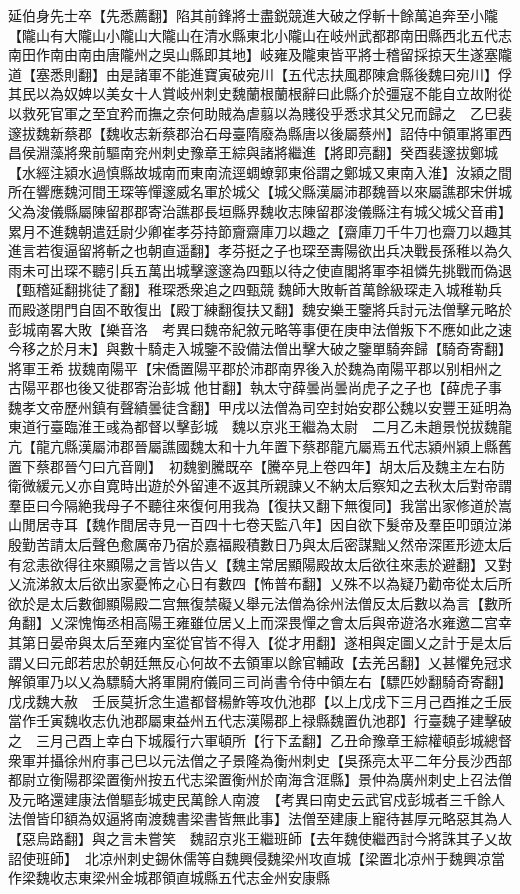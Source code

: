 延伯身先士卒【先悉薦翻】陷其前鋒將士盡鋭競進大破之俘斬十餘萬追奔至小隴【隴山有大隴山小隴山大隴山在清水縣東北小隴山在岐州武都郡南田縣西北五代志南田作南由南由唐隴州之吳山縣即其地】岐雍及隴東皆平將士稽留採掠天生遂塞隴道【塞悉則翻】由是諸軍不能進寶寅破宛川【五代志扶風郡陳倉縣後魏曰宛川】俘其民以為奴婢以美女十人賞岐州刺史魏蘭根蘭根辭曰此縣介於彊寇不能自立故附從以救死官軍之至宜矜而撫之奈何助賊為虐翦以為賤役乎悉求其父兄而歸之　乙巳裴邃拔魏新蔡郡【魏收志新蔡郡治石母臺隋廢為縣唐以後屬蔡州】詔侍中領軍將軍西昌侯淵藻將衆前驅南兖州刺史豫章王綜與諸將繼進【將即亮翻】癸酉裴邃拔鄭城【水經注潁水過慎縣故城南而東南流逕蜩蟟郭東俗謂之鄭城又東南入淮】汝潁之間所在響應魏河間王琛等憚邃威名軍於城父【城父縣漢屬沛郡魏晉以來屬譙郡宋併城父為浚儀縣屬陳留郡郡寄治譙郡長垣縣界魏收志陳留郡浚儀縣注有城父城父音甫】累月不進魏朝遣廷尉少卿崔孝芬持節齎齋庫刀以趣之【齋庫刀千牛刀也齋刀以趣其進言若復逼留將斬之也朝直遥翻】孝芬挺之子也琛至夀陽欲出兵决戰長孫稚以為久雨未可出琛不聽引兵五萬出城擊邃邃為四甄以待之使直閣將軍李祖憐先挑戰而偽退【甄稽延翻挑徒了翻】稚琛悉衆追之四甄競魏師大敗斬首萬餘級琛走入城稚勒兵而殿遂閉門自固不敢復出【殿丁練翻復扶又翻】魏安樂王鑒將兵討元法僧擊元略於彭城南畧大敗【樂音洛　考異曰魏帝紀敘元略等事便在庚申法僧叛下不應如此之速今移之於月末】與數十騎走入城鑒不設備法僧出擊大破之鑒單騎奔歸【騎奇寄翻】將軍王希拔魏南陽平【宋僑置陽平郡於沛郡南界後入於魏為南陽平郡以别相州之古陽平郡也後又徙郡寄治彭城他甘翻】執太守薛曇尚曇尚虎子之子也【薛虎子事魏孝文帝歷州鎮有聲績曇徒含翻】甲戌以法僧為司空封始安郡公魏以安豐王延明為東道行臺臨淮王彧為都督以擊彭城　魏以京兆王繼為太尉　二月乙未趙景悦拔魏龍亢【龍亢縣漢屬沛郡晉屬譙國魏太和十九年置下蔡郡龍亢屬焉五代志潁州潁上縣舊置下蔡郡晉勺曰亢音剛】　初魏劉騰既卒【騰卒見上卷四年】胡太后及魏主左右防衛微緩元乂亦自寛時出遊於外留連不返其所親諫乂不納太后察知之去秋太后對帝謂羣臣曰今隔絶我母子不聽往來復何用我為【復扶又翻下無復同】我當出家修道於嵩山閒居寺耳【魏作間居寺見一百四十七卷天監八年】因自欲下髮帝及羣臣叩頭泣涕殷勤苦請太后聲色愈厲帝乃宿於嘉福殿積數日乃與太后密謀黜乂然帝深匿形迹太后有忿恚欲得往來顯陽之言皆以告乂【魏主常居顯陽殿故太后欲往來恚於避翻】又對乂流涕敘太后欲出家憂怖之心日有數四【怖普布翻】乂殊不以為疑乃勸帝從太后所欲於是太后數御顯陽殿二宫無復禁礙乂舉元法僧為徐州法僧反太后數以為言【數所角翻】乂深愧悔丞相高陽王雍雖位居乂上而深畏憚之會太后與帝遊洛水雍邀二宫幸其第日晏帝與太后至雍内室從官皆不得入【從才用翻】遂相與定圖乂之計于是太后謂乂曰元郎若忠於朝廷無反心何故不去領軍以餘官輔政【去羌呂翻】乂甚懼免冠求解領軍乃以乂為驃騎大將軍開府儀同三司尚書令侍中領左右【驃匹妙翻騎奇寄翻】　戊戌魏大赦　壬辰莫折念生遣都督楊鮓等攻仇池郡【以上戊戌下三月己酉推之壬辰當作壬寅魏收志仇池郡屬東益州五代志漢陽郡上禄縣魏置仇池郡】行臺魏子建擊破之　三月己酉上幸白下城履行六軍頓所【行下孟翻】乙丑命豫章王綜權頓彭城總督衆軍并攝徐州府事己巳以元法僧之子景隆為衡州刺史【吳孫亮太平二年分長沙西部都尉立衡陽郡梁置衡州按五代志梁置衡州於南海含洭縣】景仲為廣州刺史上召法僧及元略還建康法僧驅彭城吏民萬餘人南渡　【考異曰南史云武官戍彭城者三千餘人法僧皆印額為奴逼將南渡魏書梁書皆無此事】法僧至建康上寵待甚厚元略惡其為人【惡烏路翻】與之言未嘗笑　魏詔京兆王繼班師【去年魏使繼西討今將誅其子乂故詔使班師】　北凉州刺史錫休儒等自魏興侵魏梁州攻直城【梁置北凉州于魏興凉當作梁魏收志東梁州金城郡領直城縣五代志金州安康縣